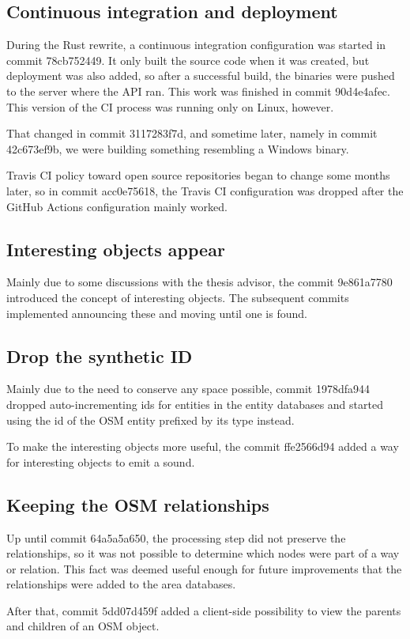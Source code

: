 \documentclass[nolof,digital]{fithesis3}
\begin{document}
\subsection{Continuous integration and deployment}
During the Rust rewrite, a continuous integration configuration was started in commit 78cb752449. It only built the source code when it was created, but deployment was also added, so after a successful build, the binaries were pushed to the server where the API ran. This work was finished in commit 90d4e4afec. This version of the CI process was running only on Linux, however.

That changed in commit 3117283f7d, and sometime later, namely in commit 42c673ef9b, we were building something resembling a Windows binary.

Travis CI policy toward open source repositories began to change some months later, so in commit acc0e75618, the Travis CI configuration was dropped after the GitHub Actions configuration mainly worked.
\subsection{Interesting objects appear}
Mainly due to some discussions with the thesis advisor, the commit 9e861a7780 introduced the concept of interesting objects. The subsequent commits implemented announcing these and moving until one is found.
\subsection{Drop the synthetic ID}
Mainly due to the need to conserve any space possible, commit 1978dfa944 dropped auto-incrementing ids for entities in the entity databases and started using the id of the OSM entity prefixed by its type instead.

To make the interesting objects more useful, the commit ffe2566d94 added a way for interesting objects to emit a sound.
\subsection{Keeping the OSM relationships}
Up until commit 64a5a5a650, the processing step did not preserve the relationships, so it was not possible to determine which nodes were part of a way or relation. This fact was deemed useful enough for future improvements that the relationships were added to the area databases.

After that, commit 5dd07d459f added a client-side possibility to view the parents and children of an OSM object.
\end{document}
